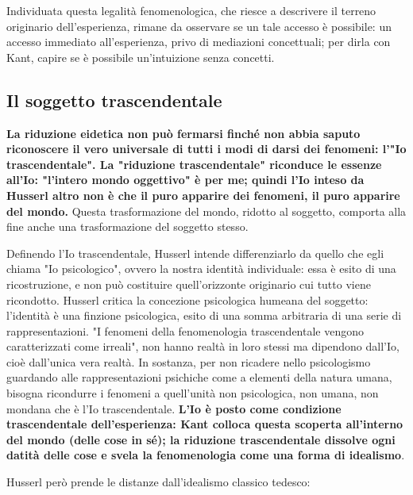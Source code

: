 Individuata questa legalità fenomenologica, che
riesce a descrivere il terreno originario dell'esperienza,
rimane da osservare se un tale accesso è possibile:
un accesso immediato all'esperienza, privo di mediazioni concettuali; per dirla con Kant, capire se è possibile un'intuizione
senza concetti.

\subsection{Il soggetto trascendentale}

\textbf{La riduzione eidetica non può fermarsi finché non abbia
saputo riconoscere il vero universale di tutti i modi di
darsi dei fenomeni: l'"Io trascendentale".
La "riduzione trascendentale" riconduce le essenze
all'Io: "l'intero mondo oggettivo" è per me; quindi l'Io inteso da Husserl altro non è che il puro apparire dei fenomeni, il puro apparire del mondo.}
Questa trasformazione del mondo, ridotto al
soggetto, comporta alla fine anche una
trasformazione del soggetto stesso.

Definendo l'Io trascendentale, Husserl intende
differenziarlo da quello che egli chiama
"Io psicologico", ovvero la nostra identità
individuale: essa è esito di una ricostruzione, e non
può costituire quell'orizzonte originario cui tutto
viene ricondotto. Husserl critica la concezione psicologica
humeana del soggetto: l'identità è una finzione
psicologica, esito di una somma arbitraria di una
serie di rappresentazioni.
"I fenomeni della fenomenologia trascendentale vengono
caratterizzati come irreali", non hanno realtà in
loro stessi ma dipendono dall'Io, cioè dall'unica
vera realtà.
In sostanza, per non ricadere nello psicologismo guardando alle rappresentazioni psichiche come a elementi della
natura umana, bisogna ricondurre i fenomeni a
quell'unità non psicologica, non umana,
non mondana che è l'Io trascendentale.
\textbf{L'Io  è posto come condizione trascendentale
dell'esperienza: Kant colloca questa scoperta
all'interno del mondo (delle cose in sé); la
riduzione trascendentale dissolve ogni datità
delle cose e svela la fenomenologia come una
forma di idealismo}.

Husserl però prende le distanze dall'idealismo classico tedesco:


